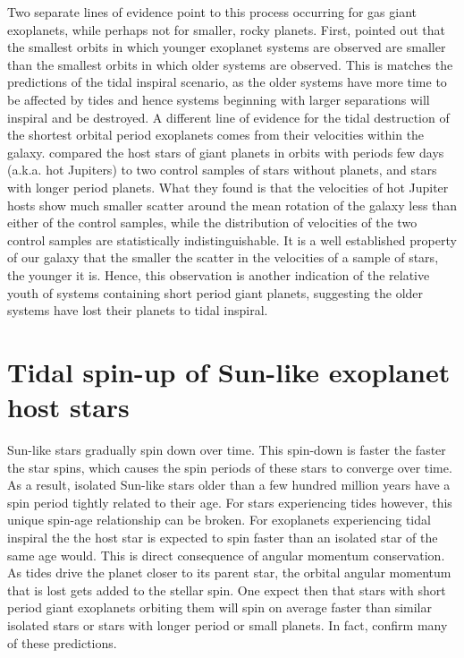 Two separate lines of evidence point to this process occurring for gas giant
exoplanets, while perhaps not for smaller, rocky planets. First,
\citet{Jackson_et_al_09} pointed out that the smallest orbits in which younger
exoplanet systems are observed are smaller than the smallest orbits in which
older systems are observed. This is matches the predictions of the tidal
inspiral scenario, as the older systems have more time to be affected by tides
and hence systems beginning with larger separations will inspiral and be
destroyed. A different line of evidence for the tidal destruction of the
shortest orbital period exoplanets comes from their velocities within the
galaxy. \citet{Hamer_Schlaufman_19} compared the host stars of giant planets in
orbits with periods few days (a.k.a. hot Jupiters) to two control samples of
stars without planets, and stars with longer period planets. What they found is
that the velocities of hot Jupiter hosts show much smaller scatter around the
mean rotation of the galaxy less than either of the control samples, while the
distribution of velocities of the two control samples are statistically
indistinguishable. It is a well established property of our galaxy that the
smaller the scatter in the velocities of a sample of stars, the younger it is.
Hence, this observation is another indication of the relative youth of systems
containing short period giant planets, suggesting the older systems have lost
their planets to tidal inspiral.

\section{Tidal spin-up of Sun-like exoplanet host stars}

Sun-like stars gradually spin down over time. This spin-down is faster the
faster the star spins, which causes the spin periods of these stars to converge
over time. As a result, isolated Sun-like stars older than a few hundred million
years have a spin period tightly related to their age. For stars experiencing
tides however, this unique spin-age relationship can be broken. For exoplanets
experiencing tidal inspiral the the host star is expected to spin faster than an
isolated star of the same age would. This is direct consequence of angular
momentum conservation. As tides drive the planet closer to its parent star, the
orbital angular momentum that is lost gets added to the stellar spin. One expect
then that stars with short period giant exoplanets orbiting them will spin on
average faster than similar isolated stars or stars with longer period or small
planets. In fact, \citet{Tajeda_et_al_21} confirm many of these predictions.

